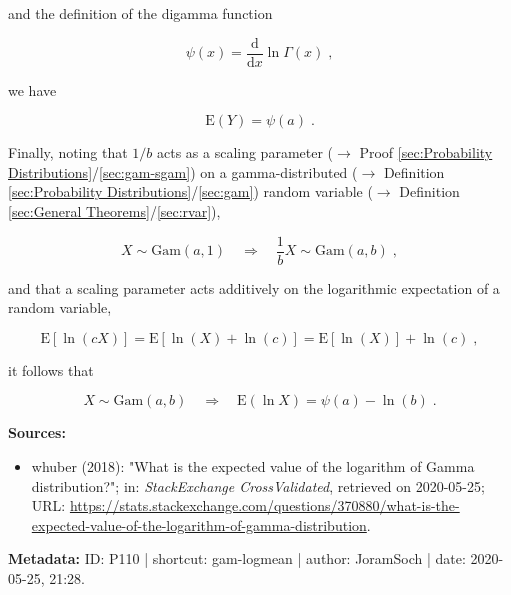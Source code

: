 \documentclass[a4paper,12pt,twoside]{book}
\begin{document}
and the definition of the digamma function

\begin{equation} \label{eq:gam-logmean-psi}
\psi(x) = \frac{\mathrm{d}}{\mathrm{d}x} \ln \Gamma(x) \; ,
\end{equation}

we have

\begin{equation} \label{eq:gam-logmean-E-Y-s2}
\mathrm{E}(Y) = \psi(a) \; .
\end{equation}

Finally, noting that $1/b$ acts as a scaling parameter ($\rightarrow$ Proof \ref{sec:Probability Distributions}/\ref{sec:gam-sgam}) on a gamma-distributed ($\rightarrow$ Definition \ref{sec:Probability Distributions}/\ref{sec:gam}) random variable ($\rightarrow$ Definition \ref{sec:General Theorems}/\ref{sec:rvar}),

\begin{equation} \label{eq:gam-logmean-gam-sgam}
X \sim \mathrm{Gam}(a,1) \quad \Rightarrow \quad \frac{1}{b} X \sim \mathrm{Gam}(a,b) \; ,
\end{equation}

and that a scaling parameter acts additively on the logarithmic expectation of a random variable,

\begin{equation} \label{eq:gam-logmean-logmean}
\mathrm{E}\left[\ln(cX)\right] = \mathrm{E}\left[\ln(X) + \ln(c)\right] = \mathrm{E}\left[\ln(X)\right] + \ln(c) \; ,
\end{equation}

it follows that

\begin{equation} \label{eq:gam-logmean-E-Y-s3}
X \sim \mathrm{Gam}(a,b) \quad \Rightarrow \quad \mathrm{E}(\ln X) = \psi(a) - \ln(b) \; .
\end{equation}


\vspace{1em}
\textbf{Sources:}
\begin{itemize}
\item whuber (2018): "What is the expected value of the logarithm of Gamma distribution?"; in: \textit{StackExchange CrossValidated}, retrieved on 2020-05-25; URL: \url{https://stats.stackexchange.com/questions/370880/what-is-the-expected-value-of-the-logarithm-of-gamma-distribution}.
\end{itemize}


\vspace{1em}
\textbf{Metadata:} ID: P110 | shortcut: gam-logmean | author: JoramSoch | date: 2020-05-25, 21:28.
\vspace{1em}
\end{document}
